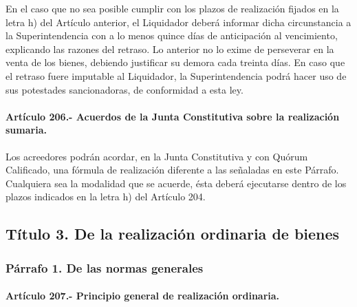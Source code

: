 \documentclass[
]{book}
\begin{document}
En el caso que no sea posible cumplir con los plazos de realización fijados en la letra h) del Artículo anterior, el Liquidador deberá informar dicha circunstancia a la Superintendencia con a lo menos quince días de anticipación al vencimiento, explicando las razones del retraso. Lo anterior no lo exime de perseverar en la venta de los bienes, debiendo justificar su demora cada treinta días. En caso que el retraso fuere imputable al Liquidador, la Superintendencia podrá hacer uso de sus potestades sancionadoras, de conformidad a esta ley.

\hypertarget{artuxedculo-206.--acuerdos-de-la-junta-constitutiva-sobre-la-realizaciuxf3n-sumaria.}{%
\paragraph*{Artículo 206.- Acuerdos de la Junta Constitutiva sobre la realización sumaria.}\label{artuxedculo-206.--acuerdos-de-la-junta-constitutiva-sobre-la-realizaciuxf3n-sumaria.}}

Los acreedores podrán acordar, en la Junta Constitutiva y con Quórum Calificado, una fórmula de realización diferente a las señaladas en este Párrafo. Cualquiera sea la modalidad que se acuerde, ésta deberá ejecutarse dentro de los plazos indicados en la letra h) del Artículo 204.

\hypertarget{tuxedtulo-3.-de-la-realizaciuxf3n-ordinaria-de-bienes}{%
\subsection*{Título 3. De la realización ordinaria de bienes}\label{tuxedtulo-3.-de-la-realizaciuxf3n-ordinaria-de-bienes}}

\hypertarget{puxe1rrafo-1.-de-las-normas-generales-1}{%
\subsubsection*{Párrafo 1. De las normas generales}\label{puxe1rrafo-1.-de-las-normas-generales-1}}

\hypertarget{artuxedculo-207.--principio-general-de-realizaciuxf3n-ordinaria.}{%
\paragraph*{Artículo 207.- Principio general de realización ordinaria.}\label{artuxedculo-207.--principio-general-de-realizaciuxf3n-ordinaria.}}
\end{document}
